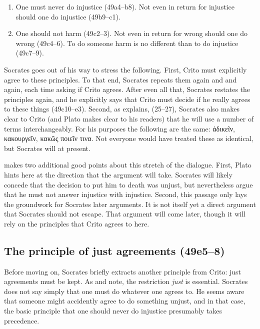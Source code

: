 \documentclass[11pt]{article}
\begin{document}
\begin{enumerate}
    \item One must never do injustice (49a4--b8).  Not even in return for injustice should one do injustice (49b9--c1).
    \item One should not harm (49c2--3).  Not even in return for wrong should one do wrong (49c4--6).  To do someone harm is no different than to do injustice (49c7--9).
\end{enumerate}

Socrates goes out of his way to stress the following.  First, Crito must explicitly agree to these principles.  To that end, Socrates repeats them again and and again, each time asking if Crito agrees.  After even all that, Socrates restates the principles again, and he explicitly says that Crito must decide if he really agrees to these things (49c10--e3).  Second, as \citet{kraut1984} explains, (25--27), Socrates also makes clear to Crito (and Plato makes clear to his readers) that he will use a number of terms interchangeably.  For his purposes the following are the same: ἀδικεῖν, κακουργεῖν, κακῶς ποιεῖν τινα.  Not everyone would have treated these as identical, but Socrates will at present.

\citet{kraut1984} makes two additional good points about this stretch of the dialogue.  First, Plato hints here at the direction that the argument will take. Socrates will likely concede that the decision to put him to death was unjust, but nevertheless argue that he must not answer injustice with injustice.  Second, this passage only lays the groundwork for Socrates later arguments.  It is not itself yet a direct argument that Socrates should not escape.  That argument will come later, though it will rely on the principles that Crito agrees to here.

\subsection{The principle of just agreements (49e5--8)}

Before moving on, Socrates briefly extracts another principle from Crito: just agreements must be kept.  As \citet{kraut1984} and \citet{brickhouse2004} note, the restriction \emph{just} is essential.  Socrates does not say simply that one must do whatever one agrees to.  He seems aware that someone might accidently agree to do something unjust, and in that case, the basic principle that one should never do injustice presumably takes precedence.
\end{document}
